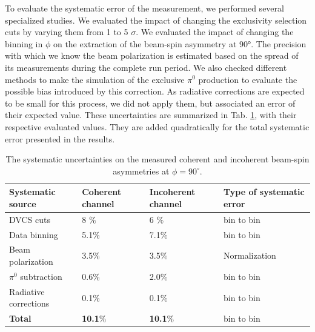 \documentclass{article}
\begin{document}
To evaluate the systematic error of the measurement, we performed several specialized studies. We 
evaluated the impact of changing the exclusivity selection cuts by varying them from 1 to 5 $\sigma$. 
We evaluated the impact of changing the binning in $\phi$ on the extraction of the beam-spin asymmetry
at 90°. The precision with which we know the beam polarization is estimated based on the spread 
of its measurements during the complete run period. We also checked different methods to make the 
simulation of the exclusive $\pi^0$ production to evaluate the 
possible bias introduced by this correction. As radiative corrections are expected to be small
for this process, we did not apply them, but associated an error of their expected value.
These uncertainties are summarized in Tab. \ref{Table:systematic_uncertainties}, with their respective 
evaluated values. They are added quadratically for the total systematic error presented in the results.

\begin{table}[tbp]
\begin{center}
	\begin{tabular}{|m{4cm}|m{2cm}<{\centering}|m{2.3cm}<{\centering}|m{3.7cm}<{\centering}|}
\hline
\bf Systematic source & \bf  Coherent channel  & \bf Incoherent channel & \bf Type of systematic 
error\\
\hline
DVCS cuts & 8 $\%$ &  6 $\%$ & bin to bin\\
\hline
Data binning & 5.1$\%$ & 7.1$\%$ &bin to bin\\
\hline
Beam polarization &  3.5$\%$ &  3.5$\%$& Normalization\\
\hline
$\pi^0$ subtraction &  0.6$\%$ &  2.0$\%$ &bin to bin\\
\hline
Radiative corrections &  0.1$\%$ & 0.1$\%$ & bin to bin\\
\hline
\textbf{Total} &  \textbf{10.1}$\%$ &   \textbf{10.1}$\%$ &bin to 
bin\\
\hline
\end{tabular}
\caption{The systematic uncertainties on the measured coherent and incoherent 
beam-spin asymmetries at $\phi = 90^{\circ}$.}
\label{Table:systematic_uncertainties}
\end{center}
\end{table}
\end{document}
